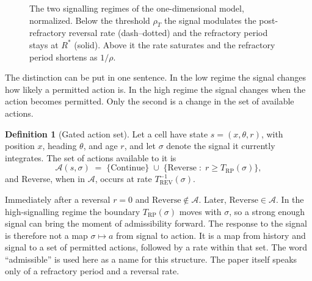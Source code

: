 \documentclass[11pt]{article}
\theoremstyle{definition}
\newtheorem{definition}{Definition}
\theoremstyle{remark}
\newcommand{\Trp}{T_{\mathrm{RP}}}
\newcommand{\Trev}{T_{\mathrm{REV}}}
\newcommand{\A}{\mathcal{A}}
\begin{document}
\begin{figure}[t]
\centering
{}
\caption{The two signalling regimes of the one-dimensional model, normalized. Below the threshold $\rho_T$ the signal modulates the post-refractory reversal rate (dash--dotted) and the refractory period stays at $R^{*}$ (solid). Above it the rate saturates and the refractory period shortens as $1/\rho$.}
\label{fig:regimes}
\end{figure}

The distinction can be put in one sentence. In the low regime the signal changes how likely a permitted action is. In the high regime the signal changes when the action becomes permitted. Only the second is a change in the set of available actions.

\begin{definition}[Gated action set]
Let a cell have state $s=(x,\theta,r)$, with position $x$, heading $\theta$, and age $r$, and let $\sigma$ denote the signal it currently integrates. The set of actions available to it is
\[
  \A(s,\sigma) \;=\; \{\mathrm{Continue}\}\;\cup\;\{\mathrm{Reverse}\;:\; r\ge \Trp(\sigma)\},
\]
and Reverse, when in $\A$, occurs at rate $\Trev^{-1}(\sigma)$.
\end{definition}

Immediately after a reversal $r=0$ and $\mathrm{Reverse}\notin\A$. Later, $\mathrm{Reverse}\in\A$. In the high-signalling regime the boundary $\Trp(\sigma)$ moves with $\sigma$, so a strong enough signal can bring the moment of admissibility forward. The response to the signal is therefore not a map $\sigma\mapsto a$ from signal to action. It is a map from history and signal to a set of permitted actions, followed by a rate within that set. The word ``admissible'' is used here as a name for this structure. The paper itself speaks only of a refractory period and a reversal rate.
\end{document}
